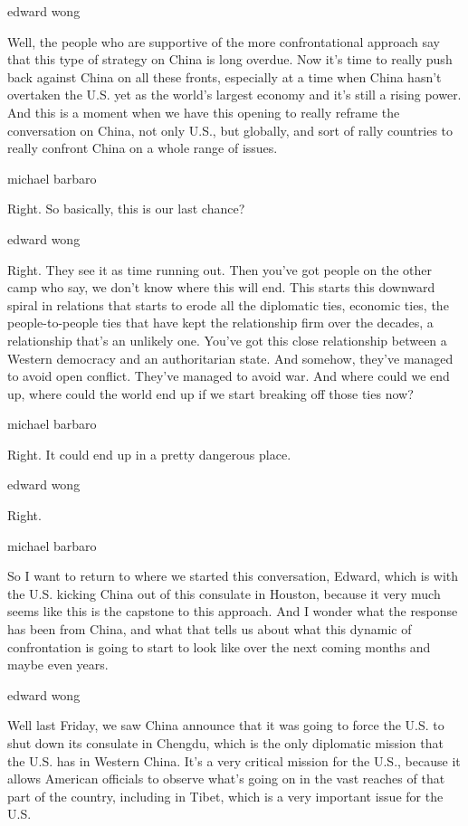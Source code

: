 edward wong

Well, the people who are supportive of the more confrontational approach
say that this type of strategy on China is long overdue. Now it's time
to really push back against China on all these fronts, especially at a
time when China hasn't overtaken the U.S. yet as the world's largest
economy and it's still a rising power. And this is a moment when we have
this opening to really reframe the conversation on China, not only U.S.,
but globally, and sort of rally countries to really confront China on a
whole range of issues.

michael barbaro

Right. So basically, this is our last chance?

edward wong

Right. They see it as time running out. Then you've got people on the
other camp who say, we don't know where this will end. This starts this
downward spiral in relations that starts to erode all the diplomatic
ties, economic ties, the people-to-people ties that have kept the
relationship firm over the decades, a relationship that's an unlikely
one. You've got this close relationship between a Western democracy and
an authoritarian state. And somehow, they've managed to avoid open
conflict. They've managed to avoid war. And where could we end up, where
could the world end up if we start breaking off those ties now?

michael barbaro

Right. It could end up in a pretty dangerous place.

edward wong

Right.

michael barbaro

So I want to return to where we started this conversation, Edward, which
is with the U.S. kicking China out of this consulate in Houston, because
it very much seems like this is the capstone to this approach. And I
wonder what the response has been from China, and what that tells us
about what this dynamic of confrontation is going to start to look like
over the next coming months and maybe even years.

edward wong

Well last Friday, we saw China announce that it was going to force the
U.S. to shut down its consulate in Chengdu, which is the only diplomatic
mission that the U.S. has in Western China. It's a very critical mission
for the U.S., because it allows American officials to observe what's
going on in the vast reaches of that part of the country, including in
Tibet, which is a very important issue for the U.S.

